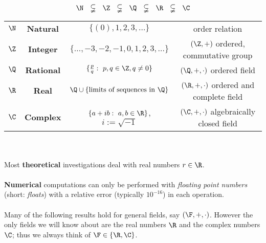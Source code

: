 \begin{frame}
$$\N ~~\subsetneqq~~ \Z~~  \subsetneqq~~   \Q ~~ \subsetneqq ~~  \R~~  \subsetneqq~~  \C $$ 
\begin{table}
	\centering
	\begin{tabular}{c|c|c|c}
		$\N$ & \textbf{Natural} 	& $\{(0),1,2,3, \ldots\}$ & order relation\\[0.2cm]
		$\Z$ & \textbf{Integer} 	& $\{ \ldots,-3,-2,-1,0,1,2,3, \ldots\}$ & $(\Z, +)$ ordered, commutative group\\[0.2cm]
		$\Q$ & \textbf{Rational} & $\{\frac{p}{q}: ~p,q\in \Z, q \neq 0\}$& $(\Q, +, \cdot)$ ordered field\\[0.2cm]
		$\R$ & \textbf{Real} 	& $ \Q \cup \{\text{limits of sequences in } \Q\}$ & $(\R, +, \cdot)$ ordered and complete field \\[0.2cm]
		$\C$ & \textbf{Complex}  & $\{a+ib:~a,b\in \R\}$, $i:= \sqrt{-1}$  & $(\C, +, \cdot)$ algebraically closed field
	\end{tabular}
	\label{tab:numbers}
\end{table}
~\\~\\
Most \textbf{theoretical} investigations deal with real numbers $r\in\R$.
 ~\\~\\
\textbf{Numerical} computations can only be performed with \textit{floating point numbers} (short: \textit{floats}) with a relative error (typically $10^{-16}$) in each operation.
~\\~\\
Many of the following results hold for general fields, say $(\F, +, \cdot)$. However the only fields we will know about are the real numbers $\R$ and the complex numbers $\C$; thus we always think of $\F \in \{\R,\C\}$.
\end{frame}



